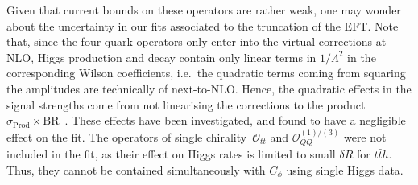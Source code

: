 Given that current bounds on these operators are rather weak, one may wonder about the uncertainty in our fits associated to the truncation of the EFT.
Note that, since the four-quark operators only enter into the virtual corrections at NLO, Higgs production and decay contain only linear terms in $1/\Lambda^{2}$ in the corresponding Wilson coefficients, i.e.~the quadratic terms coming from squaring the amplitudes are technically of next-to-NLO. 
Hence, the quadratic effects in the signal strengths come from not linearising the corrections to the product $\sigma_\mathrm{ Prod} \times \mathrm{ BR}$~\!.  These effects have been investigated, and found to have a negligible effect on the fit. 
The operators of single chirality~$\mathcal O_{tt}$ and $\mathcal{O}_{QQ}^{(1)/(3)}$ were not included in the fit, as their effect on Higgs rates is limited to small $\delta R$ for $t\bar t h$. Thus, they cannot be contained simultaneously with $C_\phi$ using single Higgs data.  
